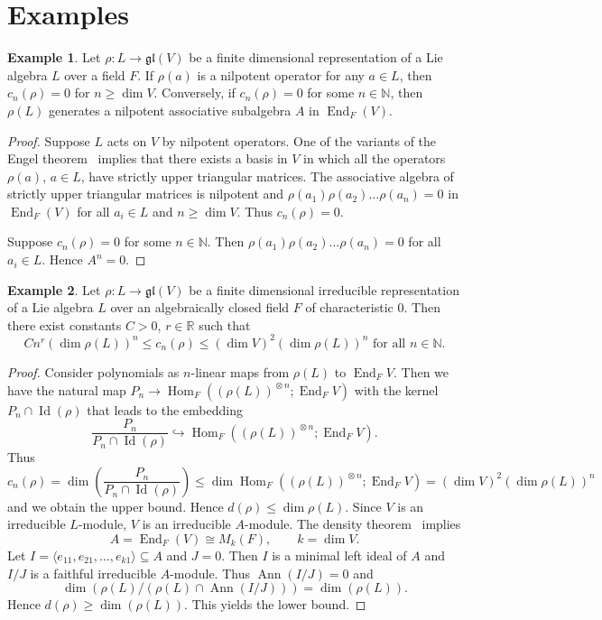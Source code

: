 \documentclass[12pt, reqno, a4paper]{amsart}
\theoremstyle{plain}
\theoremstyle{remark}
\theoremstyle{definition}
\newtheorem{example}{Example}
\begin{document}
\section{Examples}

\begin{example}
Let $\rho \colon L \to \mathfrak{gl}(V)$ be a finite dimensional
representation of a Lie algebra $L$
over a field $F$.
If $\rho(a)$ is a nilpotent operator for any $a \in L$,
then $c_n(\rho)=0$ for $n \geqslant \dim V$.
Conversely, if $c_n(\rho)=0$ for some $n\in\mathbb N$, then $\rho(L)$
generates a nilpotent associative subalgebra $A$ in
$\operatorname{End}_F(V)$.
\end{example}
\begin{proof}
Suppose $L$ acts on $V$ by nilpotent operators.
One of the variants of the Engel theorem~\cite[Corollary from Theorem~3.3]{Humphreys}
implies that there exists a basis in $V$ in which
all the operators $\rho(a)$, $a \in L$,
have strictly upper triangular matrices. The associative algebra
of strictly upper triangular matrices is nilpotent
and $\rho(a_1)\rho(a_2)\ldots \rho(a_n)=0$ in $\operatorname{End}_F(V)$
for all $a_i \in L$ and $n \geqslant \dim V$. Thus $c_n(\rho)=0$.

Suppose $c_n(\rho)=0$ for some $n\in\mathbb N$. Then
$\rho(a_1)\rho(a_2)\ldots \rho(a_n)=0$ for all $a_i \in L$.
 Hence $A^n=0$.
\end{proof}

\begin{example}\label{ExampleIrr}
Let $\rho \colon L \to \mathfrak{gl}(V)$ be a finite dimensional
irreducible representation of a Lie algebra $L$
over an algebraically closed field $F$ of characteristic $0$. Then
there exist constants $C > 0$, $r \in \mathbb R$
such that $$C n^r (\dim \rho(L))^n \leqslant c_n(\rho) \leqslant (\dim V)^2(\dim \rho(L))^n \text{ for all } n \in \mathbb N.$$
\end{example}
\begin{proof}
Consider polynomials as $n$-linear maps from $\rho(L)$ to $\operatorname{End}_F V$.
Then we have the natural map $P_n \to \operatorname{Hom}_{F}((\rho(L))^{{}\otimes n}; \operatorname{End}_F V)$
with the kernel $P_n \cap \operatorname{Id}(\rho)$
that leads to the embedding $$\frac{P_n}{P_n \cap \operatorname{Id}(\rho)}
\hookrightarrow \operatorname{Hom}_{F}((\rho(L))^{{}\otimes n}; \operatorname{End}_F V).$$
Thus $$c_n(\rho)=\dim \left(\frac{P_n}{P_n \cap \operatorname{Id}(\rho)}\right)
\leqslant \dim\operatorname{Hom}_{F}((\rho(L))^{{}\otimes n}; \operatorname{End}_F V)=
(\dim V)^2(\dim \rho(L))^n$$
and we obtain the upper bound. Hence $d(\rho) \leqslant \dim \rho(L)$.
Since $V$ is an irreducible $L$-module, $V$ is an irreducible $A$-module.
The density theorem~\cite[Section 4.3]{Jacobson} implies $$A=\operatorname{End}_F(V) \cong M_k(F),\qquad k=\dim V.$$
Let $I=\langle e_{11}, e_{21}, \ldots, e_{k1} \rangle \subseteq A$
and $J=0$. Then $I$ is a minimal left ideal of $A$ and $I/J$ is a
faithful irreducible $A$-module. Thus $\operatorname{Ann}(I/J)=0$
and $$\dim(\rho(L)/(\rho(L)\cap\operatorname{Ann}(I/J)))=\dim(\rho(L)).$$
Hence $d(\rho) \geqslant \dim(\rho(L))$. This yields the lower bound.
\end{proof}
\end{document}
